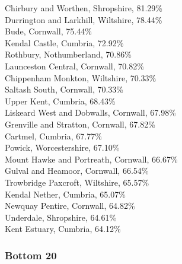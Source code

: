 \documentclass[a4paper,openany,10pt]{book}
\begin{document}
Chirbury and Worthen, Shropshire, 81.29\%\\
Durrington and Larkhill, Wiltshire, 78.44\%\\
Bude, Cornwall, 75.44\%\\
Kendal Castle, Cumbria, 72.92\%\\
Rothbury, Nothumberland, 70.86\%\\
Launceston Central, Cornwall, 70.82\%\\
Chippenham Monkton, Wiltshire, 70.33\%\\
Saltash South, Cornwall, 70.33\%\\
Upper Kent, Cumbria, 68.43\%\\
Liskeard West and Dobwalls, Cornwall, 67.98\%\\
Grenville and Stratton, Cornwall, 67.82\%\\
Cartmel, Cumbria, 67.77\%\\
Powick, Worcestershire, 67.10\%\\
Mount Hawke and Portreath, Cornwall, 66.67\%\\
Gulval and Heamoor, Cornwall, 66.54\%\\
Trowbridge Paxcroft, Wiltshire, 65.57\%\\
Kendal Nether, Cumbria, 65.07\%\\
Newquay Pentire, Cornwall, 64.82\%\\
Underdale, Shropshire, 64.61\%\\
Kent Estuary, Cumbria, 64.12\%\\

\subsubsection*{Bottom 20}
\end{document}
